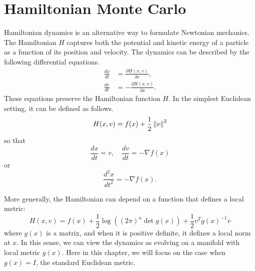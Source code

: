 
\section{Hamiltonian Monte Carlo}

Hamiltonian dynamics is an alternative way to formulate Newtonian
mechanics. The Hamiltonian $H$ captures both the potential and kinetic
energy of a particle as a function of its position and velocity. The
dynamics can be described by the following differential equations.
\begin{align*}
\frac{dx}{dt} & =\frac{\partial H(x,v)}{\partial v},\\
\frac{dv}{dt} & =-\frac{\partial H(x,v)}{\partial x}.
\end{align*}
These equations preserve the Hamiltonian function $H$. In the simplest
Euclidean setting, it can be defined as follows.
\[
H(x,v)=f(x)+\frac{1}{2}\left\Vert v\right\Vert^{2}
\]
so that 
\[
\frac{dx}{dt}=v,\quad\frac{dv}{dt}=-\nabla f(x)
\]
or
\[
\frac{d^{2}x}{dt^{2}}=-\nabla f(x).
\]

More generally, the Hamiltonian can depend on a function that defines
a local metric:
\[
H(x,v)=f(x)+\frac{1}{2}\log((2\pi)^{n}\det g(x))+\frac{1}{2}v^{T}g(x)^{-1}v
\]
where $g(x)$ is a matrix, and when it is positive definite, it defines
a local norm at $x$. In this sense, we can view the dynamics as evolving
on a manifold with local metric $g(x)$. Here in this chapter, we
will focus on the case when $g(x)=I$, the standard Euclidean metric.

